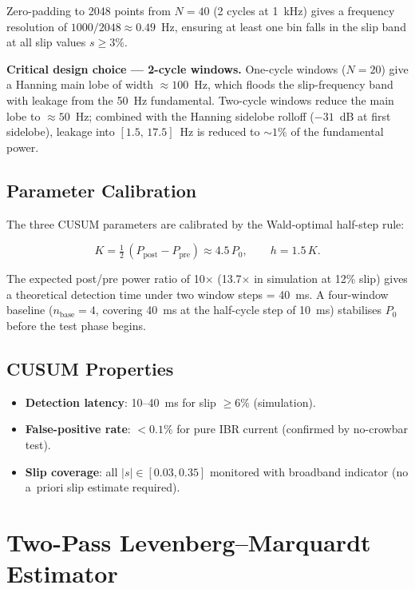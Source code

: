 \documentclass[11pt,a4paper]{article}
\begin{document}
Zero-padding to 2048 points from $N = 40$ (2 cycles at 1~kHz) gives a
frequency resolution of $1000/2048 \approx 0.49$~Hz, ensuring at least one
bin falls in the slip band at all slip values $s \geq 3\%$.

\textbf{Critical design choice — 2-cycle windows.}  One-cycle windows
($N=20$) give a Hanning main lobe of width $\approx 100$~Hz, which floods
the slip-frequency band with leakage from the 50~Hz fundamental.  Two-cycle
windows reduce the main lobe to $\approx 50$~Hz; combined with the Hanning
sidelobe rolloff ($-31$~dB at first sidelobe), leakage into $[1.5,\,17.5]$~Hz
is reduced to $\sim 1\%$ of the fundamental power.

\subsection{Parameter Calibration}

The three CUSUM parameters are calibrated by the Wald-optimal half-step rule:

\begin{equation}
  K = \tfrac{1}{2}\,(P_{\text{post}} - P_{\text{pre}}) \approx 4.5\,P_0,
  \qquad
  h = 1.5\,K.
  \label{eq:cusum_params}
\end{equation}

The expected post/pre power ratio of 10$\times$ (13.7$\times$ in simulation at
12\% slip) gives a theoretical detection time under two window steps = 40~ms.
A four-window baseline ($n_{\text{base}}=4$, covering 40~ms at the
half-cycle step of 10~ms) stabilises $P_0$ before the test phase begins.

\subsection{CUSUM Properties}

\begin{itemize}
  \item \textbf{Detection latency}: 10--40~ms for slip $\geq 6\%$ (simulation).
  \item \textbf{False-positive rate}: $<0.1\%$ for pure IBR current (confirmed
        by no-crowbar test).
  \item \textbf{Slip coverage}: all $|s|\in[0.03, 0.35]$ monitored with
        broadband indicator (no a~priori slip estimate required).
\end{itemize}

\section{Two-Pass Levenberg--Marquardt Estimator}
\label{sec:lm}
\end{document}
